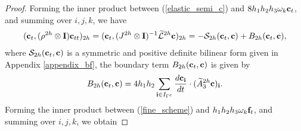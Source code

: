 \begin{proof}
		Forming the inner product between (\ref{elastic_semi_c}) and $8h_1h_2h_3\omega_k{\bf c}_t$, and summing over $i,j,k$, we have
	\begin{eqnarray}\label{coarse_simple}
	({\bf c}_t, (\rho^{2h}\otimes {\bf I}){\bf c}_{tt})_{2h} = ({\bf c}_t,(J^{2h}\otimes {\bf I})^{-1}\wt{\mathcal{L}}^{2h}{\bf c})_{2h} = -\mathcal{S}_{2h}({\bf c}_t,{\bf c}) + B_{2h}({\bf c}_t,{{\bf c}}),\nonumber
	\end{eqnarray}
	where $\mathcal{S}_{2h}({\bf c}_t,{\bf c})$ is a symmetric and positive definite bilinear form given in Appendix \ref{appendix_bf}, the boundary term $B_{2h} ({\bf c}_t,{\bf c})$ is given by
	\begin{equation}\label{bounary_c1}
	B_{2h} ({\bf c}_t,{\bf c}) = 4h_1h_2\sum_{{\bf i}\in I_{\Gamma^c}}\frac{d{\bf c}_{\bf i}}{dt}\cdot (\wt{A}_3^{2h}{\bf c})_{\bf i}.
	\end{equation}
	Forming the inner product between (\ref{fine_scheme}) and $h_1h_2h_3\omega_k{\bf f}_t$, and summing over $i,j,k$, we obtain

\end{proof}
